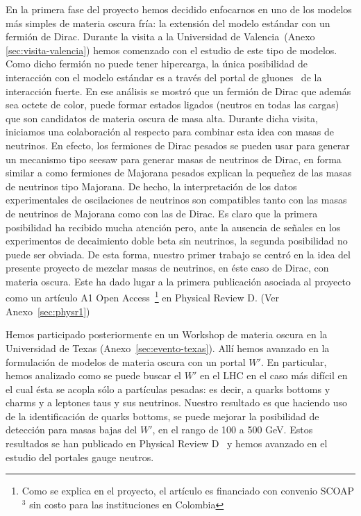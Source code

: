 En la primera fase del proyecto hemos decidido enfocarnos en uno de los modelos más simples de materia oscura fría: la extensión del modelo estándar con un fermión de Dirac.
Durante la visita a la Universidad de Valencia~(Anexo \ref{sec:visita-valencia}) hemos comenzado con el estudio de este tipo de modelos. Como dicho fermión no puede tener  hipercarga, la única posibilidad de interacción con el modelo estándar es a través del portal de gluones~\cite{DeLuca:2018mzn} de la interacción fuerte. En ese análisis se mostró que un fermión de Dirac que además sea octete de color, puede formar estados ligados (neutros en todas las cargas) que son candidatos de materia oscura de masa alta.
Durante dicha visita,  iniciamos una colaboración al respecto para combinar esta idea con masas de neutrinos. En efecto, los fermiones de Dirac pesados se pueden usar para generar un mecanismo tipo seesaw para generar masas de neutrinos de Dirac, en forma similar a como fermiones de Majorana pesados explican la pequeñez de las masas de neutrinos tipo Majorana. De hecho, la interpretación de los datos experimentales de oscilaciones de neutrinos son compatibles tanto con las masas de neutrinos de Majorana como con las de Dirac.  Es claro que la primera posibilidad ha recibido mucha atención pero, ante la ausencia de señales en los experimentos de decaimiento doble beta sin neutrinos, la segunda posibilidad no puede ser obviada. De esta forma, nuestro primer trabajo se centró en la idea del presente proyecto de mezclar masas de neutrinos, en éste caso de  Dirac, con materia oscura. Este ha dado lugar a la primera publicación asociada al proyecto~\cite{Reig:2018mdk} como un artículo A1 Open Access~\footnote{\label{ft:1}Como se explica en el proyecto, el artículo es financiado con convenio SCOAP$^3$ sin costo para las instituciones en Colombia} en Physical Review D. (Ver Anexo~\ref{sec:physr1})

Hemos participado posteriormente en un Workshop de materia oscura en la Universidad de Texas (Anexo~\ref{sec:evento-texas}). Allí hemos avanzado en la formulación de modelos de materia oscura con un portal $W'$.  En particular, hemos analizado como se puede buscar el $W'$ en el LHC  en el caso más difícil en el cual ésta se acopla sólo a partículas pesadas: es decir, a quarks bottoms y charms y a leptones taus y sus neutrinos.  Nuestro resultado es que haciendo uso de la identificación de quarks bottoms,  se puede mejorar la posibilidad de detección para masas bajas del $W'$, en el rango de 100 a 500 GeV. Estos resultados se han  publicado en Physical Review D~\cite{Abdullah:2018ets} y hemos avanzado en el estudio del portales gauge neutros.



